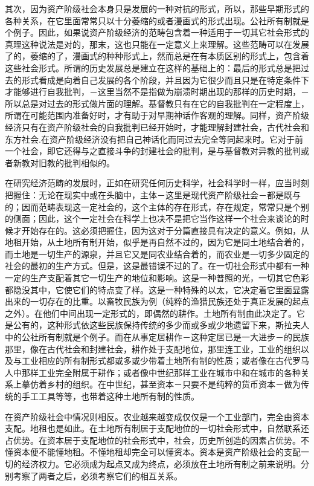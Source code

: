 \documentclass[a4paper,twoside,12pt,AutoFakeBold]{ctexart}
\begin{document}
其次，因为资产阶级社会本身只是发展的一种对抗的形式，所以，那些早期形式的各种关系，在它里面常常只以十分萎缩的或者漫画式的形式出现。公社所有制就是个例子。因此，如果说资产阶级经济的范畴包含着一种适用于一切其它社会形式的真理这种说法是对的，那末，这也只能在一定意义上来理解。这些范畴可以在发展了的，萎缩的了，漫画式的种种形式上，然而总是在有本质区别的形式上，包含着这些社会形式。所谓的历史发展总是建立在这样的基础上的：最后的形式总是把过去的形式看成是向着自己发展的各个阶段，并且因为它很少而且只是在特定条件下才能够进行自我批判，－这里当然不是指做为崩溃时期出现的那样的历史时期，－所以总是对过去的形式做片面的理解。基督教只有在它的自我批判在一定程度上，所谓在可能范围内准备好时，才有助于对早期神话作客观的理解。同样，资产阶级经济只有在资产阶级社会的自我批判已经开始时，才能理解封建社会，古代社会和东方社会.在资产阶级经济没有把自己神话化而同过去完全等同起来时。它对于前一个社会，即它还得与之直接斗争的封建社会的批判，是与基督教对异教的批判或者新教对旧教的批判相似的。

在研究经济范畴的发展时，正如在研究任何历史科学，社会科学时一样，应当时刻把握住：无论在现实中或在头脑中，主体－这里是现代资产阶级社会－都是既与的；因而范畴表现这一定社会的，这个主体的存在形式，存在规定，常常只是个别的侧面；因此，这个一定社会在科学上也决不是把它当作这样一个社会来谈论的时候才开始存在的。这必须把握住，因为这对于分篇直接具有决定的意义。例如，从地租开始，从土地所有制开始，似乎是再自然不过的，因为它是同土地结合着的，而土地是一切生产的源泉，并且它又是同农业结合着的，而农业是一切多少固定的社会的最初的生产方式。但是，这是最错误不过的了。在一切社会形式中都有一种一定的生产支配着其它一切生产的地位和影响。这是一种普照的光，一切其它色彩都隐没其中，它使它们的特点变了样。这是一种特殊的以太，它决定着它里面显露出来的一切存在的比重。以畜牧民族为例（纯粹的渔猎民族还处于真正发展的起点之外）。在他们中间出现一定形式的，即偶然的耕作。土地所有制由此决定了。它是公有的，这种形式依这些民族保持传统的多少而或多或少地遗留下来，斯拉夫人中的公社所有制就是个例子。而在从事定居耕作－这种定居已是一大进步－的民族那里，像在古代社会和封建社会，耕作处于支配地位，那里连工业，工业的组织以及与工业相应的所有制形式都或多或少带着土地所有制的性质；或者像在古代罗马人中那样工业完全附属于耕作；或者像中世纪那样工业在城市中和在城市的各种关系上摹仿着乡村的组织。在中世纪，甚至资本－只要不是纯粹的货币资本－做为传统的手工工具等等，也带着这种土地所有制的性质。

在资产阶级社会中情况则相反。农业越来越变成仅仅是一个工业部门，完全由资本支配。地租也是如此。在土地所有制居于支配地位的一切社会形式中，自然联系还占优势。在资本居于支配地位的社会形式中，社会，历史所创造的因素占优势。不懂资本便不能懂地租。不懂地租却完全可以懂资本。资本是资产阶级社会的支配一切的经济权力。它必须成为起点又成为终点，必须放在土地所有制之前来说明。分别考察了两者之后，必须考察它们的相互关系。
\end{document}
